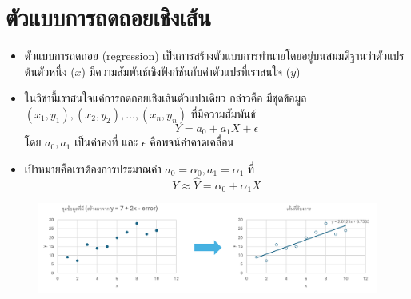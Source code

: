 \section{ตัวแบบการถดถอยเชิงเส้น}
\begin{itemize}
    \item ตัวแบบการถดถอย (regression) เป็นการสร้างตัวแบบการทำนายโดยอยู่บนสมมติฐานว่าตัวแปรต้นตัวหนึ่ง ($x$) มีความสัมพันธ์เชิงฟังก์ชันกับค่าตัวแปรที่เราสนใจ ($y$)
    \item ในวิชานี้เราสนใจแค่การถดถอยเชิงเส้นตัวแปรเดียว กล่าวคือ มีชุดข้อมูล $(x_1,y_1), (x_2, y_2), \dots, (x_n,y_n)$ ที่มีความสัมพันธ์
    $$
    Y = a_0 + a_1X + \epsilon
    $$
    โดย $a_0, a_1$ เป็นค่าคงที่ และ $\epsilon$ คือพจน์ค่าคาดเคลื่อน
    \item เป้าหมายคือเราต้องการประมาณค่า $a_0 = \alpha_0, a_1 = \alpha_1$ ที่
    $$
    Y \approx \hat{Y} = \alpha_0 + \alpha_1X
    $$
\end{itemize}
\begin{figure}[h]
    \centering
    \includegraphics[width=1\linewidth]{regressionSample.png}
\end{figure}

